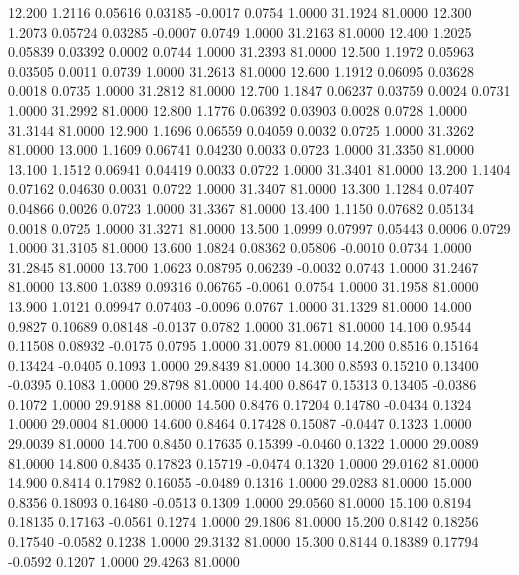   12.200   1.2116   0.05616   0.03185  -0.0017   0.0754   1.0000  31.1924  81.0000
  12.300   1.2073   0.05724   0.03285  -0.0007   0.0749   1.0000  31.2163  81.0000
  12.400   1.2025   0.05839   0.03392   0.0002   0.0744   1.0000  31.2393  81.0000
  12.500   1.1972   0.05963   0.03505   0.0011   0.0739   1.0000  31.2613  81.0000
  12.600   1.1912   0.06095   0.03628   0.0018   0.0735   1.0000  31.2812  81.0000
  12.700   1.1847   0.06237   0.03759   0.0024   0.0731   1.0000  31.2992  81.0000
  12.800   1.1776   0.06392   0.03903   0.0028   0.0728   1.0000  31.3144  81.0000
  12.900   1.1696   0.06559   0.04059   0.0032   0.0725   1.0000  31.3262  81.0000
  13.000   1.1609   0.06741   0.04230   0.0033   0.0723   1.0000  31.3350  81.0000
  13.100   1.1512   0.06941   0.04419   0.0033   0.0722   1.0000  31.3401  81.0000
  13.200   1.1404   0.07162   0.04630   0.0031   0.0722   1.0000  31.3407  81.0000
  13.300   1.1284   0.07407   0.04866   0.0026   0.0723   1.0000  31.3367  81.0000
  13.400   1.1150   0.07682   0.05134   0.0018   0.0725   1.0000  31.3271  81.0000
  13.500   1.0999   0.07997   0.05443   0.0006   0.0729   1.0000  31.3105  81.0000
  13.600   1.0824   0.08362   0.05806  -0.0010   0.0734   1.0000  31.2845  81.0000
  13.700   1.0623   0.08795   0.06239  -0.0032   0.0743   1.0000  31.2467  81.0000
  13.800   1.0389   0.09316   0.06765  -0.0061   0.0754   1.0000  31.1958  81.0000
  13.900   1.0121   0.09947   0.07403  -0.0096   0.0767   1.0000  31.1329  81.0000
  14.000   0.9827   0.10689   0.08148  -0.0137   0.0782   1.0000  31.0671  81.0000
  14.100   0.9544   0.11508   0.08932  -0.0175   0.0795   1.0000  31.0079  81.0000
  14.200   0.8516   0.15164   0.13424  -0.0405   0.1093   1.0000  29.8439  81.0000
  14.300   0.8593   0.15210   0.13400  -0.0395   0.1083   1.0000  29.8798  81.0000
  14.400   0.8647   0.15313   0.13405  -0.0386   0.1072   1.0000  29.9188  81.0000
  14.500   0.8476   0.17204   0.14780  -0.0434   0.1324   1.0000  29.0004  81.0000
  14.600   0.8464   0.17428   0.15087  -0.0447   0.1323   1.0000  29.0039  81.0000
  14.700   0.8450   0.17635   0.15399  -0.0460   0.1322   1.0000  29.0089  81.0000
  14.800   0.8435   0.17823   0.15719  -0.0474   0.1320   1.0000  29.0162  81.0000
  14.900   0.8414   0.17982   0.16055  -0.0489   0.1316   1.0000  29.0283  81.0000
  15.000   0.8356   0.18093   0.16480  -0.0513   0.1309   1.0000  29.0560  81.0000
  15.100   0.8194   0.18135   0.17163  -0.0561   0.1274   1.0000  29.1806  81.0000
  15.200   0.8142   0.18256   0.17540  -0.0582   0.1238   1.0000  29.3132  81.0000
  15.300   0.8144   0.18389   0.17794  -0.0592   0.1207   1.0000  29.4263  81.0000
